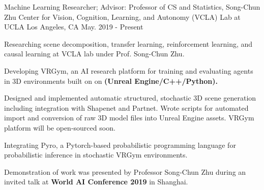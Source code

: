 \cventry
    {Machine Learning Researcher; Advisor: Professor of CS and Statistics, Song-Chun Zhu} %
    {Center for Vision, Cognition, Learning, and Autonomy (VCLA) Lab at UCLA } %
    {Los Angeles, CA} %
    {May. 2019 - Present} %
    {
    \begin{cvitems} %
        \item {Researching scene decomposition, transfer learning, reinforcement learning, and causal learning at VCLA lab under Prof. Song-Chun Zhu.}
        \item {Developing VRGym, an AI research platform for training and evaluating agents in
        3D environments built on on \textbf{(Unreal Engine/C++/Python).} } 
        \item {Designed and implemented automatic structured, stochastic 3D scene generation including integration with Shapenet and Partnet. 
        Wrote scripts for automated import and conversion of raw 3D model files into Unreal Engine assets. VRGym platform will be open-sourced soon.}
        \item {Integrating Pyro, a Pytorch-based probabilistic programming language for probabilistic inference in stochastic VRGym environments.}
        \item {Demonstration of work was presented by Professor Song-Chun Zhu during an invited talk at \textbf{World AI Conference 2019} in Shanghai.}
    \end{cvitems}
    }